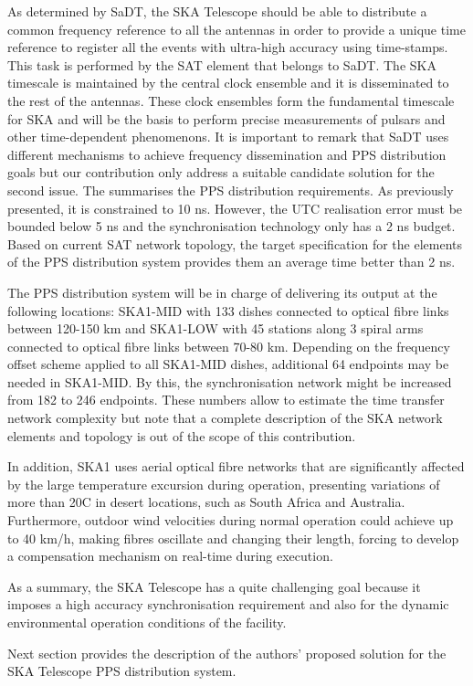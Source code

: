 As determined by SaDT, the SKA Telescope should be able to distribute a common frequency reference to all the antennas in order to provide a unique time reference to register all the events with ultra-high accuracy using time-stamps. This task is performed by the SAT element that belongs to SaDT. The SKA timescale is maintained by the central clock ensemble and it is disseminated to the rest of the antennas. These clock ensembles form the fundamental timescale for SKA and will be the basis to perform precise measurements of pulsars and other time-dependent phenomenons. It is important to remark that SaDT uses different mechanisms to achieve frequency dissemination and PPS distribution goals but our contribution only address a suitable candidate solution for the second issue. 
The \cite{paultests} summarises the PPS distribution requirements. As previously presented, it is constrained to 10 ns. However, the UTC realisation error must be bounded below 5 ns and the synchronisation technology only has a 2 ns budget. Based on current SAT network topology, the target specification for the elements of the PPS distribution system provides them an average time better than 2 ns. 

The PPS distribution system will be in charge of delivering its output at the following locations: SKA1-MID with 133 dishes connected to optical fibre links between 120-150 km and SKA1-LOW with 45 stations along 3 spiral arms connected to optical fibre links between 70-80 km. Depending on the frequency offset scheme applied to all SKA1-MID dishes, additional 64 endpoints may be needed in SKA1-MID. By this, the synchronisation network might be increased from 182 to 246 endpoints. These numbers allow to estimate the time transfer network complexity but note that a complete description of the SKA network elements and topology is out of the scope of this contribution.

In addition, SKA1 uses aerial optical fibre networks that are
significantly affected by the large temperature excursion during operation,
presenting variations of more than 20\degree C in desert locations, such as South Africa and Australia. Furthermore, outdoor wind velocities during normal operation could achieve up to 40 km/h, making fibres oscillate and changing their length, forcing to develop a compensation mechanism on real-time during execution. 

As a summary, the SKA Telescope has a quite challenging goal because it imposes a high accuracy synchronisation requirement and also for the dynamic environmental operation conditions of the facility.

Next section provides the description of the authors' proposed solution for the SKA Telescope PPS distribution system. 